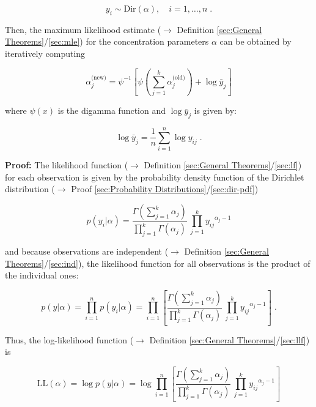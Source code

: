 \documentclass[a4paper,12pt,twoside]{book}
\begin{document}
\begin{equation} \label{eq:dir-mle-Dir}
y_i \sim \mathrm{Dir}(\alpha), \quad i = 1, \ldots, n \; .
\end{equation}

Then, the maximum likelihood estimate ($\rightarrow$ Definition \ref{sec:General Theorems}/\ref{sec:mle}) for the concentration parameters $\alpha$ can be obtained by iteratively computing

\begin{equation} \label{eq:dir-mle-Dir-MLE}
\alpha_j^{\text{(new)}} = \psi^{-1}\left[ \psi\left( \sum_{j=1}^k \alpha_j^{\text{(old)}} \right) + \log \bar{y}_j \right]
\end{equation}

where $\psi(x)$ is the digamma function and $\log \bar{y}_j$ is given by:

\begin{equation} \label{eq:dir-mle-log-pi}
\log \bar{y}_j = \frac{1}{n} \sum_{i=1}^n \log y_{ij} \; .
\end{equation}


\vspace{1em}
\textbf{Proof:} The likelihood function ($\rightarrow$ Definition \ref{sec:General Theorems}/\ref{sec:lf}) for each observation is given by the probability density function of the Dirichlet distribution ($\rightarrow$ Proof \ref{sec:Probability Distributions}/\ref{sec:dir-pdf})

\begin{equation} \label{eq:dir-mle-Dir-yi}
p(y_i|\alpha) = \frac{\Gamma\left( \sum_{j=1}^k \alpha_j \right)}{\prod_{j=1}^k \Gamma(\alpha_j)} \, \prod_{j=1}^k {y_{ij}}^{\alpha_j-1}
\end{equation}

and because observations are independent ($\rightarrow$ Definition \ref{sec:General Theorems}/\ref{sec:ind}), the likelihood function for all observations is the product of the individual ones:

\begin{equation} \label{eq:dir-mle-Dir-LF}
p(y|\alpha) = \prod_{i=1}^n p(y_i|\alpha) = \prod_{i=1}^n \left[ \frac{\Gamma\left( \sum_{j=1}^k \alpha_j \right)}{\prod_{j=1}^k \Gamma(\alpha_j)} \, \prod_{j=1}^k {y_{ij}}^{\alpha_j-1} \right] \; .
\end{equation}

Thus, the log-likelihood function ($\rightarrow$ Definition \ref{sec:General Theorems}/\ref{sec:llf}) is

\begin{equation} \label{eq:dir-mle-Dir-LL}
\mathrm{LL}(\alpha) = \log p(y|\alpha) = \log \prod_{i=1}^n \left[ \frac{\Gamma\left( \sum_{j=1}^k \alpha_j \right)}{\prod_{j=1}^k \Gamma(\alpha_j)} \, \prod_{j=1}^k {y_{ij}}^{\alpha_j-1} \right]
\end{equation}
\end{document}

